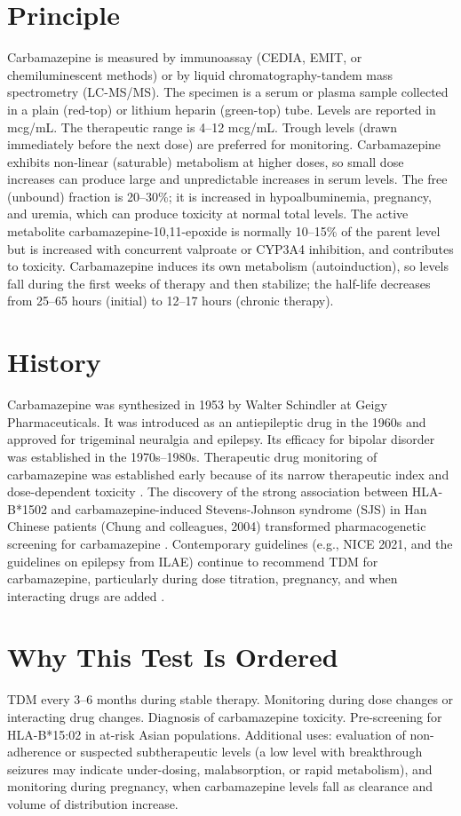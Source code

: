 \section*{Principle}
Carbamazepine is measured by immunoassay (CEDIA, EMIT, or chemiluminescent methods) or by liquid chromatography-tandem mass spectrometry (LC-MS/MS). The specimen is a serum or plasma sample collected in a plain (red-top) or lithium heparin (green-top) tube. Levels are reported in mcg/mL. The therapeutic range is 4--12 mcg/mL. Trough levels (drawn immediately before the next dose) are preferred for monitoring. Carbamazepine exhibits non-linear (saturable) metabolism at higher doses, so small dose increases can produce large and unpredictable increases in serum levels. The free (unbound) fraction is 20--30\%; it is increased in hypoalbuminemia, pregnancy, and uremia, which can produce toxicity at normal total levels. The active metabolite carbamazepine-10,11-epoxide is normally 10--15\% of the parent level but is increased with concurrent valproate or CYP3A4 inhibition, and contributes to toxicity. Carbamazepine induces its own metabolism (autoinduction), so levels fall during the first weeks of therapy and then stabilize; the half-life decreases from 25--65 hours (initial) to 12--17 hours (chronic therapy).

\section*{History}
Carbamazepine was synthesized in 1953 by Walter Schindler at Geigy Pharmaceuticals. It was introduced as an antiepileptic drug in the 1960s and approved for trigeminal neuralgia and epilepsy. Its efficacy for bipolar disorder was established in the 1970s--1980s. Therapeutic drug monitoring of carbamazepine was established early because of its narrow therapeutic index and dose-dependent toxicity \cite{patsalos2008}. The discovery of the strong association between HLA-B*1502 and carbamazepine-induced Stevens-Johnson syndrome (SJS) in Han Chinese patients (Chung and colleagues, 2004) transformed pharmacogenetic screening for carbamazepine \cite{chung2004}. Contemporary guidelines (e.g., NICE 2021, and the guidelines on epilepsy from ILAE) continue to recommend TDM for carbamazepine, particularly during dose titration, pregnancy, and when interacting drugs are added \cite{kwan2011}.

\section*{Why This Test Is Ordered}
TDM every 3--6 months during stable therapy. Monitoring during dose changes or interacting drug changes. Diagnosis of carbamazepine toxicity. Pre-screening for HLA-B*15:02 in at-risk Asian populations. Additional uses: evaluation of non-adherence or suspected subtherapeutic levels (a low level with breakthrough seizures may indicate under-dosing, malabsorption, or rapid metabolism), and monitoring during pregnancy, when carbamazepine levels fall as clearance and volume of distribution increase.

